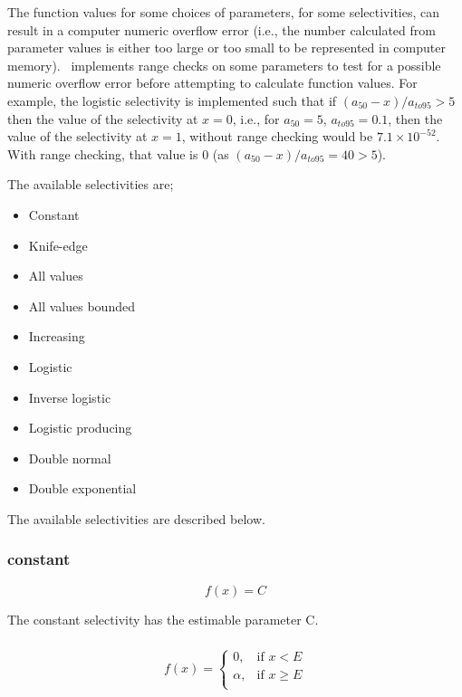The function values for some choices of parameters, for some selectivities, can result in a computer numeric overflow error (i.e., the number calculated from parameter values is either too large or too small to be represented in computer memory). \IBM\ implements range checks on some parameters to test for a possible numeric overflow error before attempting to calculate function values. For example, the logistic selectivity is implemented such that if $(a_{50}-x)/a_{to95} > 5$ then the value of the selectivity at $x=0$, i.e., for $a_{50}=5$, $a_{to95}=0.1$, then the value of the selectivity at $x=1$, without range checking would be $7.1 \times 10^{-52}$. With range checking, that value is $0$ (as $(a_{50}-x)/a_{to95}=40 > 5$).

The available selectivities are;

\begin{itemize}
  \item Constant
  \item Knife-edge
  \item All values
  \item All values bounded
  \item Increasing
  \item Logistic
  \item Inverse logistic
  \item Logistic producing
  \item Double normal
  \item Double exponential
\end{itemize}

The available selectivities are described below.

\subsubsection[Constant]{{constant}}

\begin{equation}
f(x)=C
\end{equation}

The constant selectivity has the estimable parameter C. 

\subsubsection[Knife-edge]{}
\begin{equation}
f(x)= \begin{cases}
  0, & \text{if $x < E$} \\
  \alpha, & \text{if $x \ge E$}\\ 
  \end{cases} 
\end{equation}

